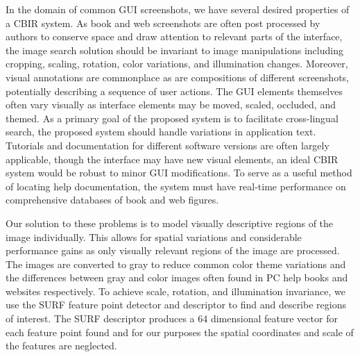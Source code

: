 \documentclass{www2010-submission}
\begin{document}
In the domain of common GUI screenshots, we have several desired
properties of a CBIR system.  As book and web screenshots are often
post processed by authors to conserve space and draw attention to
relevant parts of the interface, the image search solution should be
invariant to image manipulations including cropping, scaling,
rotation, color variations, and illumination changes.  Moreover,
visual annotations are commonplace as are compositions of different
screenshots, potentially describing a sequence of user actions.  The
GUI elements themselves often vary visually as interface elements may
be moved, scaled, occluded, and themed.  As a primary goal of the
proposed system is to facilitate cross-lingual search, the proposed
system should handle variations in application text.  Tutorials and
documentation for different software versions are often largely
applicable, though the interface may have new visual elements, an
ideal CBIR system would be robust to minor GUI modifications.  To
serve as a useful method of locating help documentation, the system
must have real-time performance on comprehensive databases of book and
web figures.

Our solution to these problems is to model visually descriptive
regions of the image individually.  This allows for spatial variations
and considerable performance gains as only visually relevant regions
of the image are processed.  The images are converted to gray to
reduce common color theme variations and the differences between gray
and color images often found in PC help books and websites
respectively.  To achieve scale, rotation, and illumination
invariance, we use the SURF feature point detector and descriptor
\cite{VanGool1370556} to find and describe regions of interest.  The
SURF descriptor produces a 64 dimensional feature vector for each
feature point found and for our purposes the spatial coordinates and
scale of the features are neglected.
\end{document}
